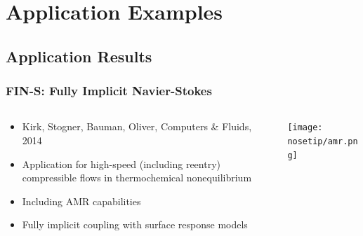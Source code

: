 \section{Application Examples}
\subsection{Application Results}



\frame
{
  \frametitle{FIN-S: Fully Implicit Navier-Stokes}

  \begin{columns}
    \begin{column}{0.45\textwidth}
      \begin{itemize}
      \item Kirk, Stogner, Bauman, Oliver, Computers \& Fluids, 2014
      \item Application for high-speed (including reentry)
        compressible flows in thermochemical nonequilibrium
      \item Including AMR capabilities
      \item Fully implicit coupling with surface response models
      \end{itemize}
    \end{column}
    \begin{column}{0.45\textwidth}
      \begin{center}
        \texttt{[image: nosetip/amr.png]}
      \end{center}
    \end{column}
  \end{columns}
}


